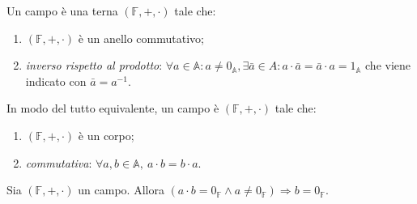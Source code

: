\begin{definition}[Campo]
	Un campo è una terna $ (\mathbb{F}, + , \cdot) $ tale che:
	\begin{enumerate}
		\item $ (\mathbb{F}, +, \cdot) $ è un anello commutativo;
		\item \emph{inverso rispetto al prodotto}: $ \forall a \in \mathbb{A}: a \neq 0_{\mathbb{A}}, \exists \bar{a} \in A : a \cdot \bar{a} = \bar{a} \cdot a = 1_{\mathbb{A}} $ che viene indicato con $ \bar{a} = a^{-1} $.
	\end{enumerate}
	In modo del tutto equivalente, un campo è $ (\mathbb{F}, + , \cdot) $ tale che:
	\begin{enumerate}
		\item $ (\mathbb{F}, +, \cdot) $ è un corpo;
		\item \emph{commutativa}: $ \forall a, b \in \mathbb{A}, \ a \cdot b = b \cdot a $.
	\end{enumerate}
\end{definition}

\begin{prop}
	Sia $ (\mathbb{F}, + , \cdot) $ un campo. Allora $ (a \cdot b = 0_{\mathbb{F}} \wedge a \neq 0_{\mathbb{F}}) \Rightarrow b = 0_{\mathbb{F}} $.
\end{prop}